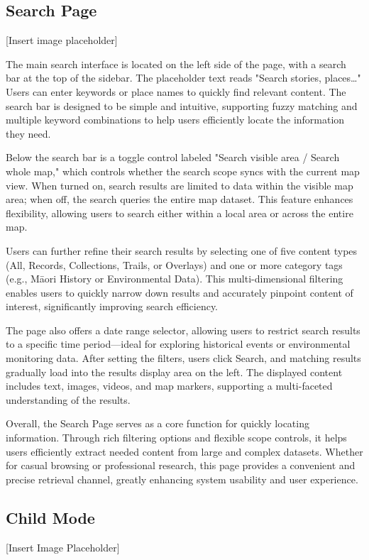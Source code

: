 \subsection{Search Page}
[Insert image placeholder]

The main search interface is located on the left side of the page, with a search bar at the top of the sidebar. The placeholder text reads "Search stories, places…" Users can enter keywords or place names to quickly find relevant content. The search bar is designed to be simple and intuitive, supporting fuzzy matching and multiple keyword combinations to help users efficiently locate the information they need.

Below the search bar is a toggle control labeled "Search visible area / Search whole map," which controls whether the search scope syncs with the current map view. When turned on, search results are limited to data within the visible map area; when off, the search queries the entire map dataset. This feature enhances flexibility, allowing users to search either within a local area or across the entire map.

Users can further refine their search results by selecting one of five content types (All, Records, Collections, Trails, or Overlays) and one or more category tags (e.g., Māori History or Environmental Data). This multi-dimensional filtering enables users to quickly narrow down results and accurately pinpoint content of interest, significantly improving search efficiency.

The page also offers a date range selector, allowing users to restrict search results to a specific time period—ideal for exploring historical events or environmental monitoring data. After setting the filters, users click Search, and matching results gradually load into the results display area on the left. The displayed content includes text, images, videos, and map markers, supporting a multi-faceted understanding of the results.

Overall, the Search Page serves as a core function for quickly locating information. Through rich filtering options and flexible scope controls, it helps users efficiently extract needed content from large and complex datasets. Whether for casual browsing or professional research, this page provides a convenient and precise retrieval channel, greatly enhancing system usability and user experience.

\subsection{Child Mode}
[Insert Image Placeholder]


